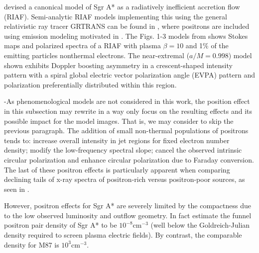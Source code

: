 \cite{2006MNRAS.367..905B} devised a canonical model of Sgr A* as a  radiatively inefficient accretion flow (RIAF). Semi-analytic RIAF models implementing  this using the general relativistic ray tracer GRTRANS \citep{2016MNRAS.462..115D} can be found in  \cite{2021arXiv210105327E}, where  positrons are included using emission modeling motivated in  \cite{2020ApJ...896...30A}. The Figs. 1-3 %
models from \cite{2021arXiv210105327E} shows Stokes maps and polarized spectra of a \cite{2006MNRAS.367..905B} RIAF with plasma $\beta=10$ and 1$\%$ of the emitting particles nonthermal electrons. The near-extremal ($a/M=0.998$) model shown exhibits Doppler boosting asymmetry in a crescent-shaped intensity pattern with a spiral global electric vector polarization angle (EVPA) pattern and polarization preferentially distributed within this region.

\hyp{As phenomenological models are not considered in this work, the position effect in this subsection may rewrite in a way only focus on the resulting effects and its possible impact for the model images. That is, we may consider to skip the previous paragraph.}
The addition of small non-thermal populations of positrons \citep{2020ApJ...896...30A,2021arXiv210105327E} tends to: increase overall intensity in jet regions for fixed electron number density; modify the low-frequency spectral slope; cancel the observed intrinsic circular polarization and enhance circular polarization due to Faraday conversion. The last of these positron effects is particularly apparent when comparing declining tails of x-ray spectra of positron-rich versus positron-poor sources, as seen in \cite{2021arXiv210105327E}.%

However, positron effects for Sgr A* are severely limited by the compactness \citep{2012MNRAS.424L..26G} due to the low observed luminosity and outflow geometry. In fact \cite{2011ApJ...735....9M} estimate the funnel positron pair density of Sgr A* to be $10^{-8}\mathrm{cm}^{-3}$ (well below the Goldreich-Julian density required to screen plasma electric fields). By contrast, the comparable density for M87 is $10^3\mathrm{cm}^{-3}$.


